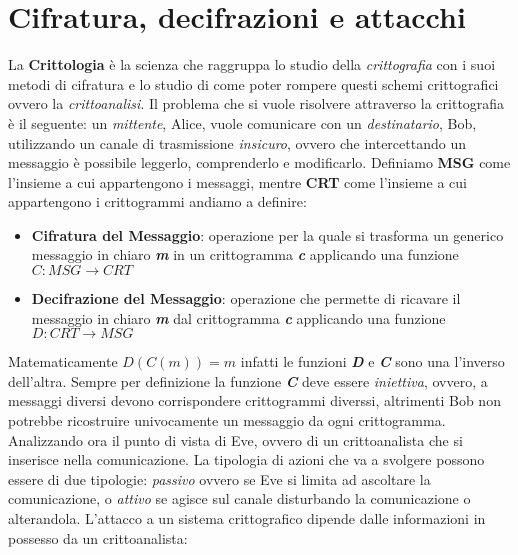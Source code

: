 \section{Cifratura, decifrazioni e attacchi}
La \textbf{Crittologia} è la scienza che raggruppa lo studio della \textit{crittografia} con i suoi metodi di cifratura e lo studio di come poter rompere questi schemi crittografici ovvero la \textit{crittoanalisi}.
Il problema che si vuole risolvere attraverso la crittografia è il seguente: un \textit{mittente}, Alice, vuole comunicare con un \textit{destinatario}, Bob, utilizzando un canale di trasmissione \textit{insicuro}, ovvero che intercettando un messaggio è possibile leggerlo, comprenderlo e modificarlo. 
\newline
Definiamo \textbf{MSG} come l'insieme a cui appartengono i messaggi, mentre \textbf{CRT} come l'insieme a cui appartengono i crittogrammi andiamo a definire:
\begin{itemize}
    \item \textbf{Cifratura del Messaggio}: operazione per la quale si trasforma un generico messaggio in chiaro \textbf{\textit{m}} in un crittogramma \textbf{\textit{c}} applicando una funzione $C: MSG \rightarrow CRT$
    \item \textbf{Decifrazione del Messaggio}: operazione che permette di ricavare il messaggio in chiaro \textbf{\textit{m}} dal crittogramma \textbf{\textit{c}} applicando una funzione $D: CRT \rightarrow MSG$
\end{itemize}
Matematicamente $D(C(m)) = m$ infatti le funzioni \textbf{\textit{D}} e \textbf{\textit{C}} sono una l'inverso dell'altra. Sempre per definizione la funzione \textbf{\textit{C}} deve essere \textit{iniettiva}, ovvero, a messaggi diversi devono corrispondere crittogrammi diverssi, altrimenti Bob non potrebbe ricostruire univocamente un messaggio da ogni crittogramma.
\newline
Analizzando ora il punto di vista di Eve, ovvero di un crittoanalista che si inserisce nella comunicazione. La tipologia di azioni che va a svolgere possono essere di due tipologie: \textit{passivo} ovvero se Eve si limita ad ascoltare la comunicazione, o \textit{attivo} se agisce sul canale disturbando la comunicazione o alterandola. 
\newline
L'attacco a un sistema crittografico dipende dalle informazioni in possesso da un crittoanalista:
